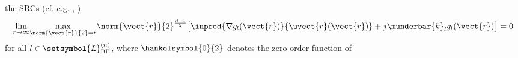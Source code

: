 the \acp{SRC}
(cf. e.g.
\cite[(1.48) or (2.8)]{book:Devaney2012},		%
\cite[(7.61)]{book:Natterer2001}%
)
\begin{equation}
  \underset{ r \rightarrow \infty }{ \lim }
  \underset{ \norm{ \vect{r} }{2} = r }{ \max }
    \norm{ \vect{r} }{2}^{ \frac{ d - 1 }{ 2 } }
    \bigl[
      \inprod{ \nabla g_{l}( \vect{r} ) }{ \uvect{r}( \vect{r} ) }
      +
      j \munderbar{k}_{l} g_{l}( \vect{r} )
    \bigr]
  = 0
 \label{eqn:app_helmholtz_src}
\end{equation}
for
all $l \in \setsymbol{L}_{ \text{BP} }^{(n)}$, where
$\hankelsymbol{0}{2}$ denotes
the zero-order  function of
